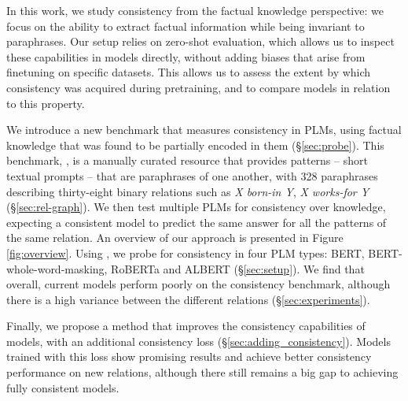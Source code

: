 In this work, we study consistency from the factual knowledge perspective: we focus on the ability to extract factual information while being invariant to paraphrases.
Our setup relies on zero-shot evaluation, which allows us to inspect these capabilities in models directly, without adding biases that arise from finetuning on specific datasets. This allows us to assess the extent by which consistency was acquired during pretraining, and to compare models in relation to this property. %


We introduce a new benchmark that measures consistency in PLMs, using factual knowledge that was found to be partially encoded in them (\S \ref{sec:probe}).
This benchmark, \resource{}, is a manually curated resource
that provides patterns -- short textual prompts -- that are paraphrases of one another, with 328 paraphrases describing thirty-eight binary relations such as \textit{X born-in Y}, \textit{X works-for Y} (\S \ref{sec:rel-graph}).
We then test multiple PLMs for consistency over knowledge, 
expecting a consistent model to predict the same answer for all the patterns of the same relation.
An overview of our approach is presented in Figure \ref{fig:overview}.
Using \resource{}, we probe for consistency in four PLM types: BERT, BERT-whole-word-masking, RoBERTa and ALBERT (\S \ref{sec:setup}).
We find that overall, current models perform poorly on the consistency benchmark, although there is a high variance between the different relations (\S \ref{sec:experiments}). 

Finally, we propose a method that improves the consistency capabilities of models, with an additional consistency loss (\S \ref{sec:adding_consistency}). Models trained with this loss show promising results and achieve better consistency performance on new relations, although there still remains a big gap to achieving fully consistent models.






